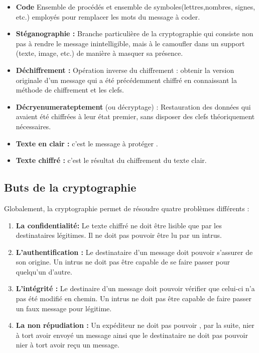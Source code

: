 \begin{itemize}
				\item \textbf{Code} Ensemble de procédés et ensemble de symboles(lettres,nombres, signes, etc.) employés pour remplacer les mots du message à coder.
				\item \textbf{Stéganographie :} Branche particulière de la cryptographie qui consiste non pas à rendre le message inintelligible, mais à le camoufler dans un support (texte, image, etc.) de manière à masquer sa présence.
				\item \textbf{Déchiffrement :} Opération inverse du chiffrement : obtenir la version originale d'un message qui a été précédemment chiffré en connaissant la méthode de chiffrement et les clefs.
				\item \textbf{Décryenumerateptement} (ou décryptage) : Restauration des données qui avaient été chiffrées à leur état premier, sans disposer des clefs théoriquement nécessaires.
				\item \textbf{Texte en clair : } c'est le message à protéger \cite{crypto2,}.
				\item \textbf{Texte chiffré : } c'est le résultat du chiffrement du texte clair.
				\end{itemize}
				
			\subsection{Buts de la cryptographie}
				Globalement, la cryptographie permet de résoudre quatre problèmes différents :
				\begin{enumerate}
					\item  \textbf{La confidentialité: } Le texte chiffré ne doit être lisible que par les destinataires légitimes. Il ne doit pas pouvoir être lu par un intrus.
					\item \textbf{L'authentification : }Le destinataire d'un message doit pouvoir s'assurer de son origine. Un intrus ne doit pas être capable de se faire passer pour quelqu'un d'autre.
					\item \textbf{L'intégrité : } Le destinaire d'un message doit pouvoir vérifier que celui-ci n'a pas été modifié en chemin. Un intrus ne doit pas être capable de faire passer un faux message pour légitime.
					\item \textbf{La non répudiation : } Un expéditeur ne doit pas pouvoir , par la suite, nier à tort avoir envoyé un message ainsi que le destinataire ne doit pas pouvoir nier à tort avoir reçu un message.
				\end{enumerate}
				
